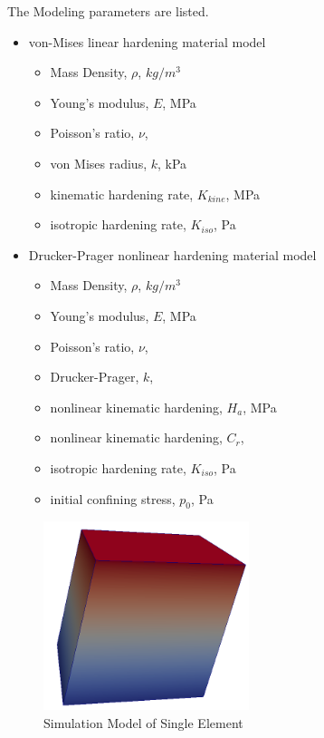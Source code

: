 The Modeling parameters are listed.
\begin{itemize}
  \item von-Mises linear hardening material model 
  \begin{itemize}
    \item Mass Density, $\rho$, \enspace {} $kg/m^3$
    \item Young's modulus, $E$, \enspace {} MPa
    \item Poisson's ratio, $\nu$, \enspace {}
    \item von Mises radius, $k$, \enspace {} kPa
    \item kinematic hardening rate, $K_{kine} $, \enspace {} MPa
    \item isotropic hardening rate, $K_{iso} $, \enspace {} Pa
  \end{itemize}
  \item Drucker-Prager nonlinear hardening material model 
  \begin{itemize}
    \item Mass Density, $\rho$, \enspace {} $kg/m^3$
    \item Young's modulus, $E$, \enspace {} MPa
    \item Poisson's ratio, $\nu$, \enspace {}
    \item Drucker-Prager, $k$, \enspace {}
    \item nonlinear kinematic hardening, $H_a$, \enspace {} MPa
    \item nonlinear kinematic hardening, $C_r$, \enspace {}
    \item isotropic hardening rate, $K_{iso} $, \enspace {} Pa
    \item initial confining stress, $p_0$, \enspace {} Pa
  \end{itemize}
\end{itemize}


\begin{figure}[H]
  \centering
  \includegraphics[width = 6cm]{./Figure-files/Day1/Single_element_Models_illustrate_the_elastic-plastic_behavior/overview.png}
  \caption{Simulation Model of Single Element}
  \label{fig_single_element_elastic-plastic}
\end{figure}

